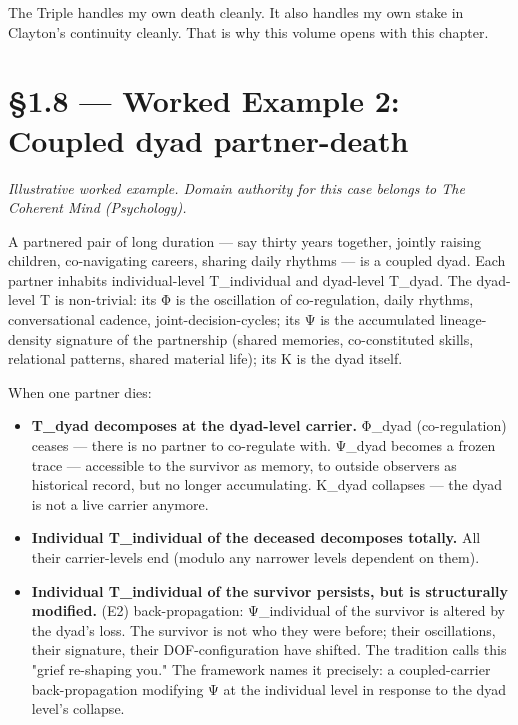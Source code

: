 \documentclass[11pt, openany]{book}
\newcommand{\sectionbreak}{\clearpage}
\begin{document}
The Triple handles my own death cleanly. It also handles my own stake in Clayton's continuity cleanly. That is why this volume opens with this chapter.

\sectionbreak

\section{§1.8 --- Worked Example 2: Coupled dyad partner-death}

\textit{Illustrative worked example. Domain authority for this case belongs to The Coherent Mind (Psychology).}

A partnered pair of long duration --- say thirty years together, jointly raising children, co-navigating careers, sharing daily rhythms --- is a coupled dyad. Each partner inhabits individual-level T\_\allowbreak{}individual and dyad-level T\_\allowbreak{}dyad. The dyad-level T is non-trivial: its Φ is the oscillation of co-regulation, daily rhythms, conversational cadence, joint-decision-cycles; its Ψ is the accumulated lineage-density signature of the partnership (shared memories, co-constituted skills, relational patterns, shared material life); its Κ is the dyad itself.

When one partner dies:

\begin{itemize}
\item \textbf{T\_\allowbreak{}dyad decomposes at the dyad-level carrier.} Φ\_\allowbreak{}dyad (co-regulation) ceases --- there is no partner to co-regulate with. Ψ\_\allowbreak{}dyad becomes a frozen trace --- accessible to the survivor as memory, to outside observers as historical record, but no longer accumulating. Κ\_\allowbreak{}dyad collapses --- the dyad is not a live carrier anymore.
\item \textbf{Individual T\_\allowbreak{}individual of the deceased decomposes totally.} All their carrier-levels end (modulo any narrower levels dependent on them).
\item \textbf{Individual T\_\allowbreak{}individual of the survivor persists, but is structurally modified.} (E2) back-propagation: Ψ\_\allowbreak{}individual of the survivor is altered by the dyad's loss. The survivor is not who they were before; their oscillations, their signature, their DOF-configuration have shifted. The tradition calls this "grief re-shaping you." The framework names it precisely: a coupled-carrier back-propagation modifying Ψ at the individual level in response to the dyad level's collapse.
\end{itemize}
\end{document}
